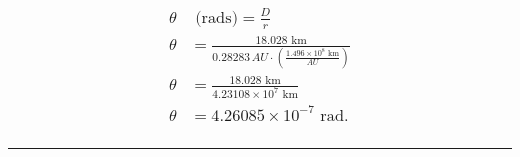 \documentclass[
]{article}
\begin{document}
\hypertarget{beginmatrix-theta-textrads-fracdr-theta-frac18.028textkm0.28283-au-cdot-left-frac1.496-times-108textkmau-right-theta-frac18.028textkm4.23108-times-107textkm-theta-4.26085-times-10--7textrad.-endmatrix}{%
\subsubsection{\texorpdfstring{{\[\begin{matrix}
\theta & {\text{~(rads)} = \frac{D}{r}} \\
\theta & {= \frac{18.028\text{~km}}{0.28283\, AU \cdot \left( \frac{1.496 \times 10^{8}\text{~km}}{AU} \right)}} \\
\theta & {= \frac{18.028\text{~km}}{4.23108 \times 10^{7}\text{~km}}} \\
\theta & {= 4.26085 \times 10^{- 7}\text{~rad}.} \\
\end{matrix}\]}}{\textbackslash begin\{matrix\}
\textbackslash theta \& \{\textbackslash text\{\textasciitilde(rads)\} = \textbackslash frac\{D\}\{r\}\} \textbackslash\textbackslash{}
\textbackslash theta \& \{= \textbackslash frac\{18.028\textbackslash text\{\textasciitilde km\}\}\{0.28283\textbackslash, AU \textbackslash cdot \textbackslash left( \textbackslash frac\{1.496 \textbackslash times 10\^{}\{8\}\textbackslash text\{\textasciitilde km\}\}\{AU\} \textbackslash right)\}\} \textbackslash\textbackslash{}
\textbackslash theta \& \{= \textbackslash frac\{18.028\textbackslash text\{\textasciitilde km\}\}\{4.23108 \textbackslash times 10\^{}\{7\}\textbackslash text\{\textasciitilde km\}\}\} \textbackslash\textbackslash{}
\textbackslash theta \& \{= 4.26085 \textbackslash times 10\^{}\{- 7\}\textbackslash text\{\textasciitilde rad\}.\} \textbackslash\textbackslash{}
\textbackslash end\{matrix\}}}\label{beginmatrix-theta-textrads-fracdr-theta-frac18.028textkm0.28283-au-cdot-left-frac1.496-times-108textkmau-right-theta-frac18.028textkm4.23108-times-107textkm-theta-4.26085-times-10--7textrad.-endmatrix}}

\begin{center}\rule{0.5\linewidth}{0.5pt}\end{center}
\end{document}
